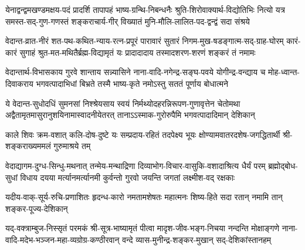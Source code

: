 
\fourlineindentedshloka
{येनाद्वन्द्वमखण्डमक्षय-पदं प्रादर्शि तापापहं}
{भाष्य-ग्रन्थि-निबन्धनैः श्रुति-शिरोवाक्यार्थ-विद्योतिभिः}
{नित्यो यत्र समस्त-सद्-गुण-गणस्तं शङ्कराचार्य-गीर्}
{विख्यातं मुनि-मौलि-लालित-पद-द्वन्द्वं सदा संश्रये}


\fourlineindentedshloka
{वेदान्त-व्रात-नीरं शत-पथ-कथित-न्याय-रत्न-प्रपूरं}
{पारावारं सुतारं निगम-मुख-षडङ्गात्म-सद्-ग्राह-घोरम्}
{कारं-कारं सुगाहं श्रुत-मत-मथितैर्ब्रह्म-विद्यामृतं यः}
{प्रादादादाय तस्मादशरण-शरणं शङ्करं तं नमामः}


\fourlineindentedshloka
{वेदान्तार्थ-विभासकाय गुरवे शान्ताय सन्न्यासिने}
{नाना-वादि-नगेन्द्र-सङ्घ-पवये योगीन्द्र-वन्द्याय च}
{मोह-ध्वान्त-दिवाकराय भगवत्पादाभिधां बिभ्रते}
{तस्मै भाष्य-कृते नमोऽस्तु सततं पूर्णाय बोधात्मने}


\fourlineindentedshloka
{ये वेदान्त-सुधोदधिं सुमनसां निश्श्रेयसाय स्वयं}
{निर्मथ्योदहरन्निरूपण-गुणावृत्तेन चेतोमथा}
{अद्वैतामृतमासुरानुशयिनामास्वादनीयेतरत्}
{तानाऽऽस्माक-गुरोरुपैमि भगवत्पादादिमान् देशिकान्}


\fourlineindentedshloka
{काले शिवः क्रम-वशात् कलि-दोष-दुष्टे}
{यः सम्प्रदाय-रहितं तदपेक्ष्य भूयः}
{क्षोण्यामवातरदशेष-जगद्धितार्थी}
{श्री-शङ्कराख्यममलं गुरुमाश्रये तम्}


\fourlineindentedshloka
{वेदाद्यागम-दुग्ध-सिन्धु-मथनात् तन्मेय-मन्थाद्रिणा}
{दिव्याभोग-विचार-वासुकि-वशादाश्रित्य धैर्यं परम्}
{ब्रह्मोद्बोध-सुधां विधाय दयया मर्त्यानमर्त्यानमी}
{कुर्वन्तो गुरवो जयन्ति जगतां लक्ष्मीश-वद् रक्षकाः}


\fourlineindentedshloka
{यदीय-वाक्-सूर्य-रुचि-प्रणाशितः}
{हृदन्ध-कारो नमतामशेषतः}
{महात्मनः शिष्य-हिते सदा रतान्}
{नमामि तान् शङ्कर-पूज्य-देशिकान्}


\fourlineindentedshloka
{यद्-वक्त्राम्बुज-निस्सृतं परमकं श्री-सूत्र-भाष्यामृतं}
{पीत्वा मादृश-जीव-भङ्ग-निचया नन्दन्ति मोक्षाङ्गणे}
{नाना-वादि-मदेभ-भञ्जन-महा-व्यग्रोग्र-कण्ठीरवान्}
{वन्दे व्यास-मुनीन्द्र-शङ्कर-मुखान् सद्-देशिकांस्तानहम्}

